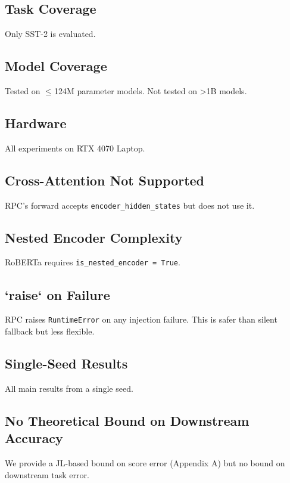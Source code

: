 \subsection{Task Coverage}

Only SST-2 is evaluated.

\subsection{Model Coverage}

Tested on $\le$124M parameter models. Not tested on \textgreater{}1B models.

\subsection{Hardware}

All experiments on RTX 4070 Laptop.

\subsection{Cross-Attention Not Supported}

RPC's forward accepts \texttt{encoder\_hidden\_states} but does not use it.

\subsection{Nested Encoder Complexity}

RoBERTa requires \texttt{is\_nested\_encoder = True}.

\subsection{`raise` on Failure}

RPC raises \texttt{RuntimeError} on any injection failure. This is safer than 
silent fallback but less flexible.

\subsection{Single-Seed Results}

All main results from a single seed.

\subsection{No Theoretical Bound on Downstream Accuracy}

We provide a JL-based bound on score error (Appendix A) but no bound on 
downstream task error.


